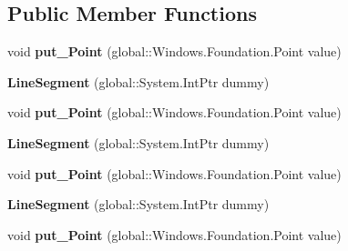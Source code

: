 \subsection*{Public Member Functions}
\begin{DoxyCompactItemize}
\item 
\mbox{\label{class_windows_1_1_u_i_1_1_xaml_1_1_media_1_1_line_segment_afbdf9cc139beb78eee51b3e6d83eaef1}} 
void {\bfseries put\+\_\+\+Point} (global\+::\+Windows.\+Foundation.\+Point value)
\item 
\mbox{\label{class_windows_1_1_u_i_1_1_xaml_1_1_media_1_1_line_segment_adbb35ad6a94127a1b7e648cbed2567c2}} 
{\bfseries Line\+Segment} (global\+::\+System.\+Int\+Ptr dummy)
\item 
\mbox{\label{class_windows_1_1_u_i_1_1_xaml_1_1_media_1_1_line_segment_afbdf9cc139beb78eee51b3e6d83eaef1}} 
void {\bfseries put\+\_\+\+Point} (global\+::\+Windows.\+Foundation.\+Point value)
\item 
\mbox{\label{class_windows_1_1_u_i_1_1_xaml_1_1_media_1_1_line_segment_adbb35ad6a94127a1b7e648cbed2567c2}} 
{\bfseries Line\+Segment} (global\+::\+System.\+Int\+Ptr dummy)
\item 
\mbox{\label{class_windows_1_1_u_i_1_1_xaml_1_1_media_1_1_line_segment_afbdf9cc139beb78eee51b3e6d83eaef1}} 
void {\bfseries put\+\_\+\+Point} (global\+::\+Windows.\+Foundation.\+Point value)
\item 
\mbox{\label{class_windows_1_1_u_i_1_1_xaml_1_1_media_1_1_line_segment_adbb35ad6a94127a1b7e648cbed2567c2}} 
{\bfseries Line\+Segment} (global\+::\+System.\+Int\+Ptr dummy)
\item 
\mbox{\label{class_windows_1_1_u_i_1_1_xaml_1_1_media_1_1_line_segment_afbdf9cc139beb78eee51b3e6d83eaef1}} 
void {\bfseries put\+\_\+\+Point} (global\+::\+Windows.\+Foundation.\+Point value)

\end{DoxyCompactItemize}
